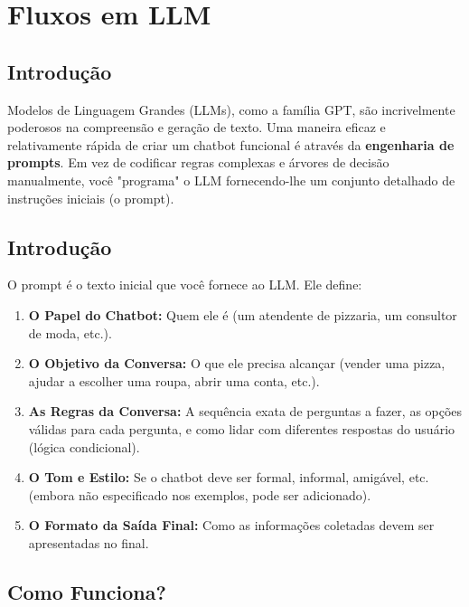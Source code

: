 \documentclass[14pt,a4paper,oneside]{book}
\begin{document}
\chapter{Fluxos em LLM}

\section{Introdução}

Modelos de Linguagem Grandes (LLMs), como a família GPT, são incrivelmente poderosos na compreensão e geração de texto. Uma maneira eficaz e relativamente rápida de criar um chatbot funcional é através da \textbf{engenharia de prompts}. Em vez de codificar regras complexas e árvores de decisão manualmente, você "programa" o LLM fornecendo-lhe um conjunto detalhado de instruções iniciais (o prompt).

\section{Introdução}

O prompt é o texto inicial que você fornece ao LLM. Ele define:

\begin{enumerate}
    \item \textbf{O Papel do Chatbot:} Quem ele é (um atendente de pizzaria, um consultor de moda, etc.).
    \item \textbf{O Objetivo da Conversa:} O que ele precisa alcançar (vender uma pizza, ajudar a escolher uma roupa, abrir uma conta, etc.).
    \item \textbf{As Regras da Conversa:} A sequência exata de perguntas a fazer, as opções válidas para cada pergunta, e como lidar com diferentes respostas do usuário (lógica condicional).
    \item \textbf{O Tom e Estilo:} Se o chatbot deve ser formal, informal, amigável, etc. (embora não especificado nos exemplos, pode ser adicionado).
    \item \textbf{O Formato da Saída Final:} Como as informações coletadas devem ser apresentadas no final.
\end{enumerate}

\section*{Como Funciona?}
\end{document}
